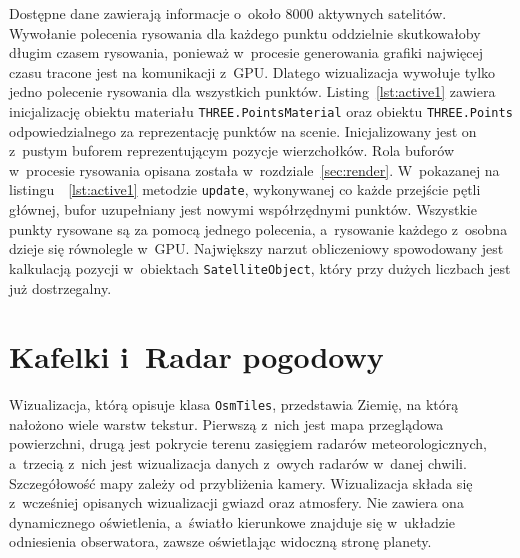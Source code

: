 Dostępne dane zawierają informacje o~około 8000 aktywnych satelitów. Wywołanie polecenia rysowania dla każdego punktu oddzielnie skutkowałoby długim czasem rysowania, ponieważ w~procesie generowania grafiki najwięcej czasu tracone jest na komunikacji z~GPU. Dlatego wizualizacja wywołuje tylko jedno polecenie rysowania dla wszystkich punktów. Listing~\ref{lst:active1} zawiera inicjalizację obiektu materiału \texttt{THREE.PointsMaterial} oraz obiektu \texttt{THREE.Points} odpowiedzialnego za reprezentację punktów na scenie. Inicjalizowany jest on z~pustym buforem reprezentującym pozycje wierzchołków. Rola buforów w~procesie rysowania opisana została w~rozdziale~\ref{sec:render}. W~pokazanej na listingu~~\ref{lst:active1} metodzie \texttt{update}, wykonywanej co każde przejście pętli głównej, bufor uzupełniany jest nowymi współrzędnymi punktów. Wszystkie punkty rysowane są za pomocą jednego polecenia, a~rysowanie każdego z~osobna dzieje się równolegle w~GPU. Największy narzut obliczeniowy spowodowany jest kalkulacją pozycji w~obiektach \texttt{SatelliteObject}, który przy dużych liczbach jest już dostrzegalny.

\section{Kafelki i~Radar pogodowy}

Wizualizacja, którą opisuje klasa \texttt{OsmTiles}, przedstawia Ziemię, na którą nałożono wiele warstw tekstur. Pierwszą z~nich jest mapa przeglądowa powierzchni, drugą jest pokrycie terenu zasięgiem radarów meteorologicznych, a~trzecią z~nich jest wizualizacja danych z~owych radarów w~danej chwili. Szczegółowość mapy zależy od przybliżenia kamery. Wizualizacja składa się z~wcześniej opisanych wizualizacji gwiazd oraz atmosfery. Nie zawiera ona dynamicznego oświetlenia, a~światło kierunkowe znajduje się w~układzie odniesienia obserwatora, zawsze oświetlając widoczną stronę planety.

